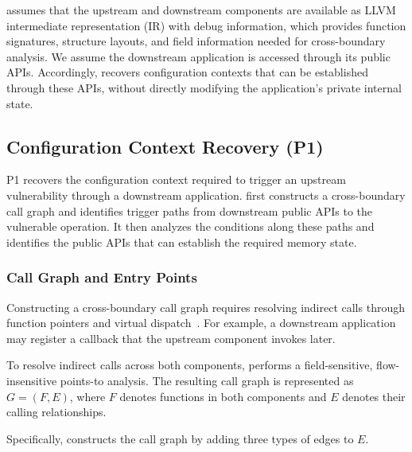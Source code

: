 \sys assumes that the upstream and downstream components are available as LLVM intermediate representation (IR) with debug information, which provides function signatures, structure layouts, and field information needed for cross-boundary analysis.
%
We assume the downstream application is accessed through its public APIs.
Accordingly, \sys recovers configuration contexts that can be established through these APIs, without directly modifying the application's private internal state.

\subsection{Configuration Context Recovery (P1)}\label{subsec:p1}
P1 recovers the configuration context required to trigger an upstream vulnerability through a downstream application. \sys first constructs a cross-boundary call graph and identifies trigger paths from downstream public APIs to the vulnerable operation. It then analyzes the conditions along these paths and identifies the public APIs that can establish the required memory state.

\subsubsection{Call Graph and Entry Points}
Constructing a cross-boundary call graph requires resolving indirect calls through function pointers and virtual dispatch~\cite{li2025redefining, mlta-ccs19, liu2024improving}. For example, a downstream application may register a callback that the upstream component invokes later. 

To resolve indirect calls across both components, \sys performs a field-sensitive, flow-insensitive points-to analysis. The resulting call graph is represented as $G=(F,E)$, where $F$ denotes functions in both components and $E$ denotes their calling relationships.



Specifically, \sys constructs the call graph by adding three types of edges to $E$.


